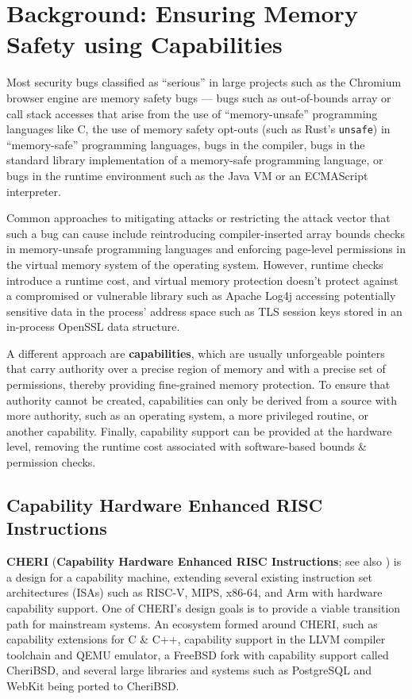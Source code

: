 \documentclass[main.tex]{subfiles}
\begin{document}
\onlyinsubfile{\mainmatter{}}

\chapter{Background: Ensuring Memory Safety using Capabilities} \label{ch:cheri}
Most security bugs classified as \enquote{serious} in large projects such as the Chromium browser engine \cite{chromium} are memory safety bugs — bugs such as out-of-bounds array or call stack accesses that arise from the use of \enquote{memory-unsafe} programming languages like C, the use of memory safety opt-outs (such as Rust’s \texttt{unsafe}) in \enquote{memory-safe} programming languages, bugs in the compiler, bugs in the standard library implementation of a memory-safe programming language, or bugs in the runtime environment such as the Java VM or an ECMAScript interpreter.

Common approaches to mitigating attacks or restricting the attack vector that such a bug can cause include reintroducing compiler-inserted array bounds checks in memory-unsafe programming languages and enforcing page-level permissions in the virtual memory system of the operating system. However, runtime checks introduce a runtime cost, and virtual memory protection doesn’t protect against a compromised or vulnerable library such as Apache Log4j accessing potentially sensitive data in the process’ address space such as TLS session keys stored in an in-process OpenSSL data structure.

A different approach are \textbf{capabilities}, which are usually unforgeable pointers that carry authority over a precise region of memory and with a precise set of permissions, thereby providing fine-grained memory protection. To ensure that authority cannot be created, capabilities can only be derived from a source with more authority, such as an operating system, a more privileged routine, or another capability. Finally, capability support can be provided at the hardware level, removing the runtime cost associated with software-based bounds \& permission checks.

\section{Capability Hardware Enhanced RISC Instructions}
\textbf{CHERI} (\textbf{Capability Hardware Enhanced RISC Instructions}; see also \cite{intro2cheri}) is a design for a capability machine, extending several existing instruction set architectures (ISAs) such as RISC-V, MIPS, x86-64, and Arm with hardware capability support. One of CHERI’s design goals is to provide a viable transition path for mainstream systems. An ecosystem formed around CHERI, such as capability extensions for C \& C++, capability support in the LLVM compiler toolchain and QEMU emulator, a FreeBSD fork with capability support called CheriBSD, and several large libraries and systems such as PostgreSQL and WebKit being ported to CheriBSD.
\end{document}
